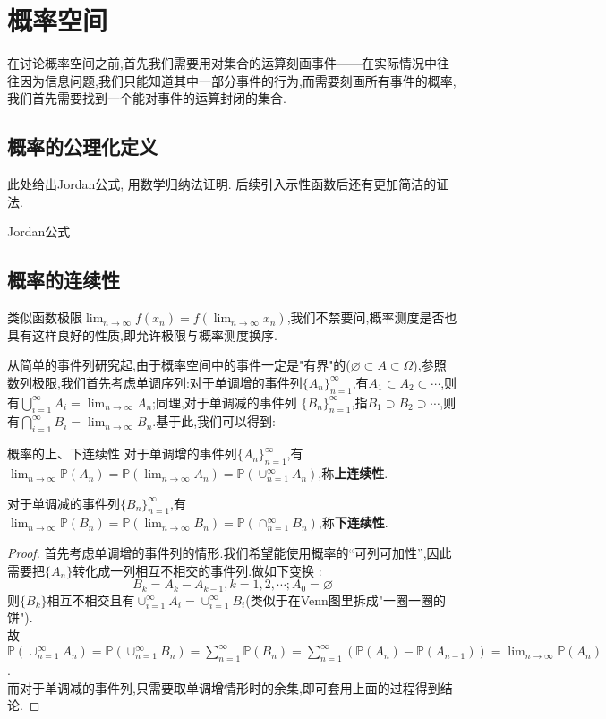 \chapter{概率空间}
在讨论概率空间之前,首先我们需要用对集合的运算刻画事件——在实际情况中往往因为信息问题,我们只能知道其中一部分事件的行为,而需要刻画所有事件的概率,我们首先需要找到一个能对事件的运算封闭的集合.
\section{概率的公理化定义}
此处给出Jordan公式, 用数学归纳法证明. 后续引入示性函数后还有更加简洁的证法.
\begin{theorem}{Jordan公式}{}
    
\end{theorem}
\section{概率的连续性}
类似函数极限$\lim_{n\to\infty}f(x_n)=f(\lim_{n\to\infty}x_n)$,我们不禁要问,概率测度是否也具有这样良好的性质,即允许极限与概率测度换序.

从简单的事件列研究起,由于概率空间中的事件一定是"有界"的($\varnothing \subset A\subset \Omega$),参照数列极限,我们首先考虑单调序列:对于单调增的事件列$\{A_n\}_{n=1}^{\infty}$,有$A_1\subset A_2\subset \cdots$,则有$\bigcup_{i=1}^{\infty}A_i=\lim_{n\to\infty}A_n$;同理,对于单调减的事件列
$\{B_n\}_{n=1}^{\infty}$,指$B_1\supset B_2\supset \cdots$,则有$\bigcap_{i=1}^{\infty}B_i=\lim_{n\to\infty}B_n$.基于此,我们可以得到:
\begin{theorem}{概率的上、下连续性}{}
    对于单调增的事件列$\{A_n\}_{n=1}^{\infty}$,有$\lim_{n\to\infty}\mathbb{P}(A_n)=\mathbb{P}(\lim_{n\to\infty}A_n)=\mathbb{P}(\cup_{n=1}^{\infty}A_n)$,称\textbf{上连续性}.

    对于单调减的事件列$\{B_n\}_{n=1}^{\infty}$,有$\lim_{n\to\infty}\mathbb{P}(B_n)=\mathbb{P}(\lim_{n\to\infty}B_n)=\mathbb{P}(\cap_{n=1}^{\infty}B_n)$,称\textbf{下连续性}.
\end{theorem}
\begin{proof}
    首先考虑单调增的事件列的情形.我们希望能使用概率的“可列可加性”,因此需要把$\{A_n\}$转化成一列相互不相交的事件列.做如下变换 :
    $$B_k=A_k-A_{k-1},k=1,2,\cdots;A_0=\varnothing$$
    则$\{B_k\}$相互不相交且有$\cup_{i=1}^{\infty}{A_i}=\cup_{i=1}^{\infty}B_i$(类似于在Venn图里拆成"一圈一圈的饼").\\
    故$\mathbb{P}(\cup_{n=1}^{\infty}A_n)=\mathbb{P}(\cup_{n=1}^{\infty}B_n)=\sum_{n=1}^{\infty}\mathbb{P}(B_n)=\sum_{n=1}^{\infty}(\mathbb{P}(A_{n})-\mathbb{P}(A_{n-1}))=\lim_{n\to\infty}\mathbb{P}(A_n)$.\\
    而对于单调减的事件列,只需要取单调增情形时的余集,即可套用上面的过程得到结论.
\end{proof}

